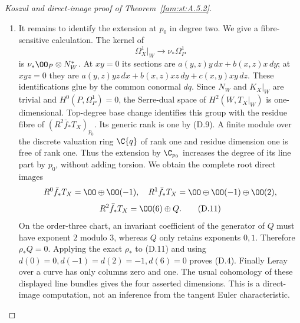 \begin{proof}[Koszul and direct-image proof of Theorem~\ref{fam:st:A.5.2}]
\begin{enumerate}[label=\arabic*.,leftmargin=*]
\item It remains to identify the extension at $p_0$ in degree two. We give
a fibre-sensitive calculation. The kernel of
\[
 \Omega_X^1|_W\longrightarrow\nu_*\Omega_P^1
\]
is $\nu_*\OO_P\otimes N_W^*$. At $xy=0$ its sections are
$a(y,z)y\,dx+b(x,z)x\,dy$; at $xyz=0$ they are
$a(y,z)yz\,dx+b(x,z)xz\,dy+c(x,y)xy\,dz$.
These identifications glue by the common conormal $dq$.
Since $N_W$ and $K_X|_W$ are trivial and $H^0(P,\Omega_P^1)=0$, the
Serre-dual space of $H^2(W,T_X|_W)$ is one-dimensional.
Top-degree base change identifies this group with the residue fibre
of $(R^2\bar f_*T_X)_{p_0}$. Its generic rank is one by (D.9).
A finite module over the discrete valuation ring $\C\{q\}$ of rank
one and residue dimension one is free of rank one. Thus the extension
by $\C_{p_0}$ increases the degree of its line part by $p_0$, without
adding torsion. We obtain the complete root direct images
\[
 R^0\bar f_*T_X=\OO\oplus\OO(-1),\quad
 R^1\bar f_*T_X=\OO\oplus\OO(-1)\oplus\OO(2),
\]
\[
 R^2\bar f_*T_X=\OO(6)\oplus Q.                       \tag{D.11}
\]
On the order-three chart, an invariant coefficient of the generator
of $Q$ must have exponent $2$ modulo $3$, whereas $Q$ only retains
exponents $0,1$. Therefore $\rho_*Q=0$. Applying the exact $\rho_*$
to (D.11) and using
$d(0)=0,d(-1)=d(2)=-1,d(6)=0$ proves (D.4).
Finally Leray over a curve has only columns zero and one. The usual
cohomology of these displayed line bundles gives the four asserted
dimensions. This is a direct-image computation, not an inference from
the tangent Euler characteristic.
\end{enumerate}
\end{proof}


